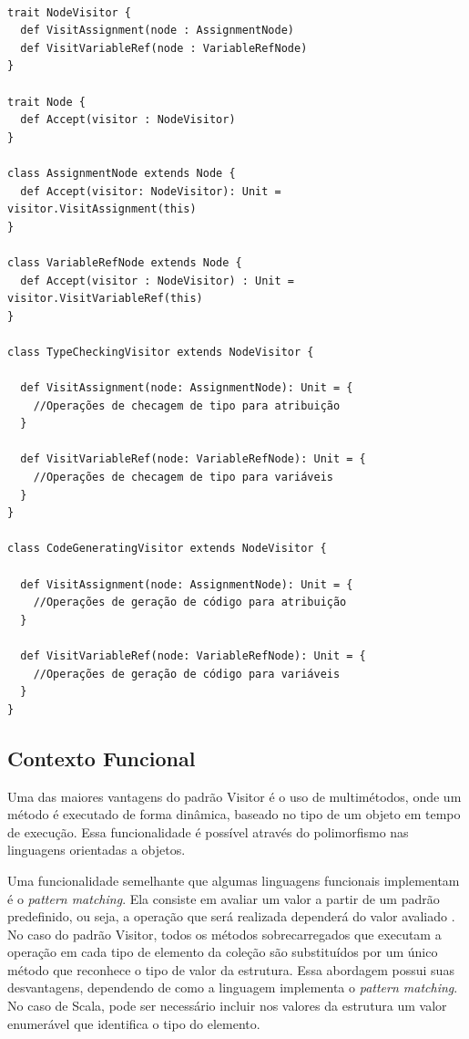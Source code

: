 \begin{lstlisting}[caption={Visitor Orientação a Objetos},label=oovisitor]

trait NodeVisitor {
  def VisitAssignment(node : AssignmentNode)
  def VisitVariableRef(node : VariableRefNode)
}

trait Node {
  def Accept(visitor : NodeVisitor)
}

class AssignmentNode extends Node {
  def Accept(visitor: NodeVisitor): Unit = visitor.VisitAssignment(this)
}

class VariableRefNode extends Node {
  def Accept(visitor : NodeVisitor) : Unit = visitor.VisitVariableRef(this)
}

class TypeCheckingVisitor extends NodeVisitor {

  def VisitAssignment(node: AssignmentNode): Unit = {
    //Operações de checagem de tipo para atribuição
  }

  def VisitVariableRef(node: VariableRefNode): Unit = {
    //Operações de checagem de tipo para variáveis
  }
}

class CodeGeneratingVisitor extends NodeVisitor {

  def VisitAssignment(node: AssignmentNode): Unit = {
    //Operações de geração de código para atribuição
  }

  def VisitVariableRef(node: VariableRefNode): Unit = {
    //Operações de geração de código para variáveis
  }
}

\end{lstlisting}

\subsection*{Contexto Funcional}

Uma das maiores vantagens do padrão Visitor 
é o uso de multimétodos, onde um método é 
executado de forma dinâmica, baseado no tipo 
de um objeto em tempo de execução. Essa 
funcionalidade é possível através do polimorfismo 
nas linguagens orientadas a objetos.\cite{gamma:1995}

Uma funcionalidade semelhante que algumas 
linguagens funcionais implementam é o 
\textit{pattern matching}\cite{realworldhaskell,
functionalscala}. 
Ela consiste em avaliar um valor a partir de 
um padrão predefinido, ou seja, a operação 
que será realizada dependerá do valor avaliado
\cite{functionalscala}. 
No caso do padrão Visitor, todos os métodos 
sobrecarregados que executam a operação 
em cada tipo de elemento da coleção são 
substituídos por um único método que 
reconhece o tipo de valor da estrutura. 
Essa abordagem possui suas desvantagens, 
dependendo de como a linguagem implementa 
o \textit{pattern matching}. No caso de Scala, 
pode ser necessário incluir nos valores da 
estrutura um valor enumerável que identifica o 
tipo do elemento. 

